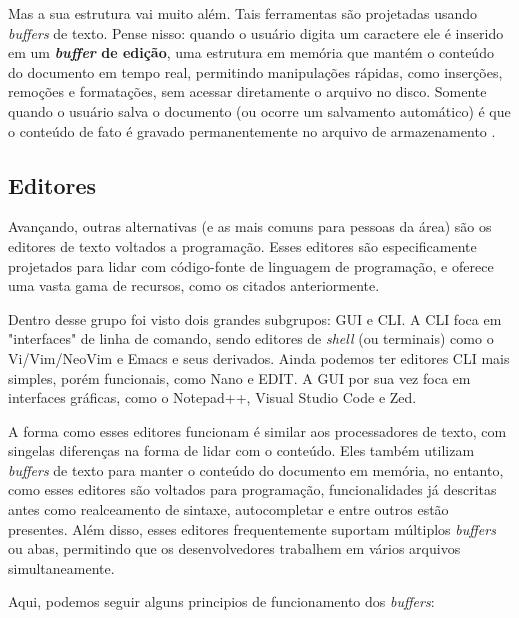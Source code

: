 Mas a sua estrutura vai muito além. Tais ferramentas são projetadas usando \textit{buffers}
de texto. Pense nisso: quando o usuário digita um caractere ele é inserido em um
\textbf{\textit{buffer} de edição}, uma estrutura em memória que mantém o
conteúdo do documento em tempo real, permitindo manipulações rápidas, como
inserções, remoções e formatações, sem acessar diretamente o arquivo no disco. Somente
quando o usuário salva o documento (ou ocorre um salvamento automático) é que o conteúdo
de fato é gravado permanentemente no arquivo de armazenamento \cite{Jacobson1989}.

\subsection{Editores}

Avançando, outras alternativas (e as mais comuns para pessoas da área) são os editores
de texto voltados a programação. Esses editores são especificamente projetados
para lidar com código-fonte de linguagem de programação, e oferece uma vasta gama
de recursos, como os citados anteriormente.

Dentro desse grupo foi visto dois grandes subgrupos: GUI e CLI. A CLI foca em "interfaces"
de linha de comando, sendo editores de \textit{shell} (ou terminais) como o Vi/Vim/NeoVim
e Emacs e seus derivados. Ainda podemos ter editores CLI mais simples, porém
funcionais, como Nano e EDIT. A GUI por sua vez foca em interfaces gráficas, como
o Notepad++, Visual Studio Code e Zed.

A forma como esses editores funcionam é similar aos processadores de texto, com singelas
diferenças na forma de lidar com o conteúdo. Eles também utilizam \textit{buffers}
de texto para manter o conteúdo do documento em memória, no entanto, como esses editores
são voltados para programação, funcionalidades já descritas antes como
realceamento de sintaxe, autocompletar e entre outros estão presentes. Além
disso, esses editores frequentemente suportam múltiplos \textit{buffers} ou abas,
permitindo que os desenvolvedores trabalhem em vários arquivos simultaneamente.

Aqui, podemos seguir alguns principios de funcionamento dos \textit{buffers}:


